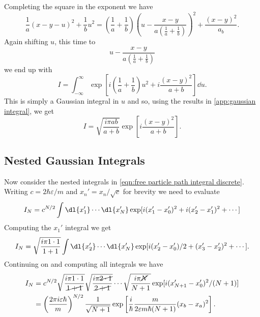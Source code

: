 \documentclass[fleqn]{NotesClass}
\begin{document}
    Completing the square in the exponent we have
    \begin{equation}
        \frac{1}{a}(x - y - u)^2 + \frac{1}{b}u^2 = \left( \frac{1}{a} + \frac{1}{b} \right)\left( u - \frac{x - y}{a\left( \frac{1}{a} + \frac{1}{b} \right)} \right)^2 + \frac{(x - y)^2}{a _ b}.
    \end{equation}
    Again shifting \(u\), this time to
    \begin{equation}
        u - \frac{x - y}{a\left( \frac{1}{a} + \frac{1}{b} \right)}
    \end{equation}
    we end up with
    \begin{equation}
        I = \int_{-\infty}^{\infty} \exp\left[ i(\frac{1}{a} + \frac{1}{b})u^2 + i\frac{(x - y)^2}{a + b} \right] \dd{u}.
    \end{equation}
    This is simply a Gaussian integral in \(u\) and so, using the results in \cref{app:gaussian integral}, we get
    \begin{equation}
        I = \sqrt{\frac{i\pi ab}{a + b}} \exp\left[ i\frac{(x - y)^2}{a + b} \right].
    \end{equation}
    
    \subsection{Nested Gaussian Integrals}
    Now consider the nested integrals in \cref{eqn:free particle path integral discrete}.
    Writing \(c = 2\hbar \varepsilon/m\) and \(x_n' = x_n/\sqrt{c}\) for brevity we need to evaluate
    \begin{equation}
        I_N = c^{N/2} \int \dl{x_1'} \dotsm \dl{x_N'} \exp[i(x_1' - x_0')^2 + i(x_2' - x_1')^2 + \dotsb ]
    \end{equation}
    Computing the \(x_1'\) integral we get
    \begin{equation}
        I_N = \sqrt{\frac{i \pi 1\cdot 1}{1 + 1}} \int \dl{x_2'} \dotsm \dl{x_N'} \exp[i(x_2' - x_0')/2 + (x_3' - x_2')^2 + \dotsm].
    \end{equation}
    Continuing on and computing all integrals we have
    \begin{align}
        I_N &= c^{N/2} \sqrt{\frac{i\pi 1\cdot1}{\cancel{1 + 1}}} \sqrt{\frac{i\pi \cancel{2\cdot 1}}{\cancel{2 + 1}}} \dotsm \sqrt{\frac{i\pi \cancel{N}}{N + 1}} \exp[i(x'_{N+1} - x_0')^2/(N+1)]\\
        &= \left( \frac{2\pi i\varepsilon \hbar}{m} \right)^{N/2} \frac{1}{\sqrt{N + 1}} \exp\left[ \frac{i}{\hbar}\frac{m}{2\varepsilon m\hbar(N+1)} (x_b - x_a)^2 \right].
    \end{align}
    
\end{document}
